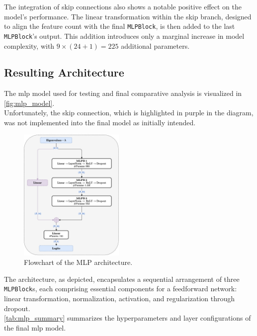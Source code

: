 The integration of skip connections also shows a notable positive effect on the model's performance.
The linear transformation within the skip branch, designed to align the feature count with the final \texttt{MLPBlock}, is then
added to the last \texttt{MLPBlock}'s output.
This addition introduces only a marginal increase in model complexity, with \( 9 \times ( 24 + 1) = 225 \) additional parameters.\\


\subsection{Resulting Architecture}
\label{sub:mlp_architecture}

The \gls{mlp} model used for testing and final comparative analysis is visualized in \autoref{fig:mlp_model}.\\
Unfortunately, the skip connection, which is highlighted in purple in the diagram, was not implemented into the final model as initially intended.

\begin{figure}[H]
    \centering
    \includegraphics[width=0.45\textwidth]{figures/06_ModelExploration/mlp.pdf}
    \caption{Flowchart of the MLP architecture.}
    \label{fig:mlp_model}
\end{figure}

The architecture, as depicted, encapsulates a sequential arrangement of three \texttt{MLPBlock}s, each comprising essential
components for a feedforward network: linear transformation, normalization, activation, and regularization through
dropout.\\

\autoref{tab:mlp_summary} summarizes the hyperparameters and layer configurations of the final \gls{mlp} model.

